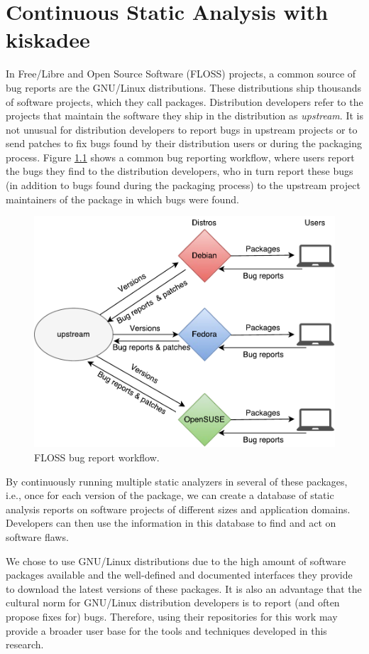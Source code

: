 \chapter{Continuous Static Analysis with kiskadee}
\label{ch:continuous_static_analysis}

In Free/Libre and Open Source Software (FLOSS) projects, a
common source of bug reports are the GNU/Linux distributions.
These distributions ship thousands of software projects, which
they call packages. Distribution developers refer to the
projects that maintain the software they ship in the
distribution as \textit{upstream}.  It is not unusual for
distribution developers to report bugs in upstream projects or
to send patches to fix bugs found by their distribution users
or during the packaging process. Figure
\ref{fig:floss_bugs_workflow} shows a common bug reporting
workflow, where users report the bugs they find to the
distribution developers, who in turn report these bugs (in
addition to bugs found during the packaging process) to the
upstream project maintainers of the package in which bugs were
found.

\begin{figure}[!h]
  \centering
  \includegraphics[width=.60\textwidth]{figures/floss_bugs_workflow} 
  \caption{FLOSS bug report workflow.}
  \label{fig:floss_bugs_workflow} 
\end{figure}

By continuously running multiple static analyzers in several of these packages,
i.e., once for each version of the package, we can create a database of static
analysis reports on software projects of different sizes and application
domains. Developers can then use the information in this database to find and
act on software flaws.

We chose to use GNU/Linux distributions due to the high amount
of software packages available and the well-defined and
documented interfaces they provide to download the latest
versions of these packages. It is also an advantage that the
cultural norm for GNU/Linux distribution developers is to
report (and often propose fixes for) bugs. Therefore, using
their repositories for this work may provide a broader user
base for the tools and techniques developed in this research.

